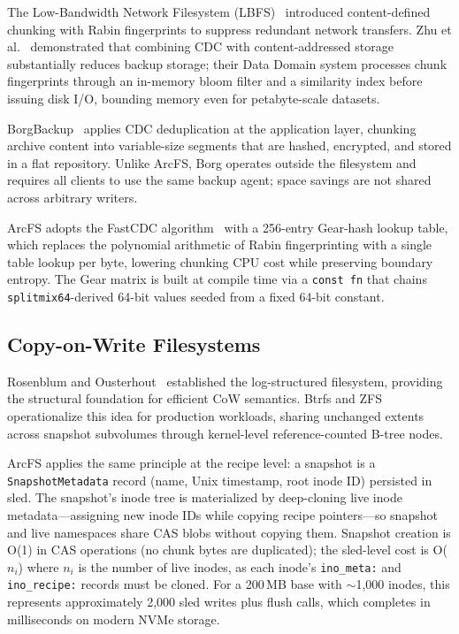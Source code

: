 \documentclass[5p,times]{elsarticle}
\begin{document}
The Low-Bandwidth Network Filesystem (LBFS)~\cite{muthitacharoen2001lbfs}
introduced content-defined chunking with Rabin fingerprints to suppress
redundant network transfers. Zhu et al.~\cite{zhu2008dedup} demonstrated
that combining CDC with content-addressed storage substantially reduces
backup storage; their Data Domain system processes chunk fingerprints
through an in-memory bloom filter and a similarity index before issuing
disk I/O, bounding memory even for petabyte-scale datasets.

BorgBackup~\cite{borgbackup2024} applies CDC deduplication at the
application layer, chunking archive content into variable-size segments
that are hashed, encrypted, and stored in a flat repository.  Unlike ArcFS,
Borg operates outside the filesystem and requires all clients to use the
same backup agent; space savings are not shared across arbitrary writers.

ArcFS adopts the FastCDC algorithm~\cite{xia2016fastcdc} with a 256-entry
Gear-hash lookup table, which replaces the polynomial arithmetic of Rabin
fingerprinting with a single table lookup per byte, lowering chunking CPU
cost while preserving boundary entropy.  The Gear matrix is built at compile
time via a \texttt{const fn} that chains \texttt{splitmix64}-derived 64-bit
values seeded from a fixed 64-bit constant.

\subsection{Copy-on-Write Filesystems}

Rosenblum and Ousterhout~\cite{rosenblum1992lfs} established the
log-structured filesystem, providing the structural foundation for efficient
CoW semantics. Btrfs and ZFS operationalize this idea for production
workloads, sharing unchanged extents across snapshot subvolumes through
kernel-level reference-counted B-tree nodes.

ArcFS applies the same principle at the recipe level: a snapshot is a
\texttt{SnapshotMetadata} record (name, Unix timestamp, root inode ID)
persisted in sled.  The snapshot's inode tree is materialized by deep-cloning
live inode metadata---assigning new inode IDs while copying recipe
pointers---so snapshot and live namespaces share CAS blobs without copying
them.  Snapshot creation is O(1) in CAS operations (no chunk bytes are
duplicated); the sled-level cost is O($n_i$) where $n_i$ is the number of
live inodes, as each inode's \texttt{ino\_meta:} and \texttt{ino\_recipe:}
records must be cloned.  For a 200\,MB base with $\sim$1{,}000 inodes, this
represents approximately 2{,}000 sled writes plus flush calls, which
completes in milliseconds on modern NVMe storage.
\end{document}
